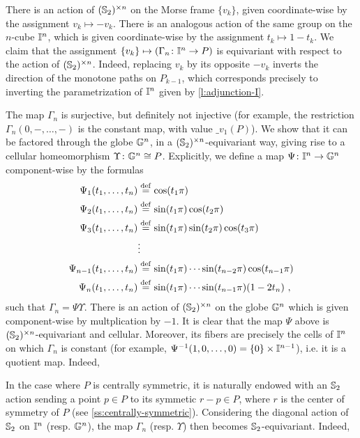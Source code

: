 There is an action of $(\mathbb{S}_2)^{\times n}$ on the Morse frame $\{ v_k \}$, given coordinate-wise by the assignment $v_k \mapsto -v_k$.
There is an analogous action of the same group on the $n$-cube $\mathbb{I}^n$, which is given coordinate-wise by the assignment $t_k \mapsto 1-t_k$.
We claim that the assignment $\{v_k\} \mapsto (\Gamma_n \colon \mathbb{I}^n \to P)$ is equivariant with respect to the action of $(\mathbb{S}_2)^{\times n}$.
Indeed, replacing $v_k$ by its opposite $-v_k$ inverts the direction of the monotone paths on $P_{k-1}$, which corresponds precisely to inverting the parametrization of $\mathbb{I}^n$ given by \cref{l:adjunction-I}.

The map $\Gamma_n$ is surjective, but definitely not injective (for example, the restriction $\Gamma_n(0,-,\ldots,-)$ is the constant map, with value $\bm_{v_1}(P)$).
We show that it can be factored through the globe $\mathbb{G}^n$, in a $(\mathbb{S}_2)^{\times n}$-equivariant way, giving rise to a cellular homeomorphism $\Upsilon \colon \mathbb{G}^n \cong P$.
Explicitly, we define a map $\Psi \colon \mathbb{I}^n \to \mathbb{G}^n$ component-wise by the formulas
\begin{align*}
	\Psi_1(t_1,\ldots,t_n) & \stackrel{\mathrm{def}}{=} \cos(t_1 \pi) \\
	\Psi_2(t_1,\ldots,t_n) & \stackrel{\mathrm{def}}{=} \sin(t_1 \pi)\cos(t_2\pi) \\
	\Psi_3(t_1,\ldots,t_n) & \stackrel{\mathrm{def}}{=} \sin(t_1 \pi)\sin(t_2\pi)\cos(t_3\pi) \\
	 & \vdots \\
	\Psi_{n-1}(t_1,\ldots,t_n) & \stackrel{\mathrm{def}}{=} \sin(t_1 \pi) \cdots \sin(t_{n-2} \pi) \cos(t_{n-1} \pi) \\
	\Psi_n(t_1,\ldots,t_n) & \stackrel{\mathrm{def}}{=}  \sin(t_1 \pi) \cdots \sin(t_{n-1} \pi)  (1-2t_n)\ ,
\end{align*}
such that $\Gamma_n = \Psi \Upsilon$.
There is an action of $(\mathbb{S}_2)^{\times n}$ on the globe $\mathbb{G}^n$ which is given component-wise by multplication by $-1$.
It is clear that the map $\Psi$ above is $(\mathbb{S}_2)^{\times n}$-equivariant and cellular.
Moreover, its fibers are precisely the cells of $\mathbb{I}^n$ on which $\Gamma_n$ is constant (for example, $\Psi^{-1}(1,0,\ldots,0)=\{0\} \times \mathbb{I}^{n-1}$), i.e. it is a quotient map.
Indeed,

In the case where $P$ is centrally symmetric, it is naturally endowed with an $\mathbb{S}_2$ action sending a point $p \in P$ to its symmetic $r-p \in P$, where $r$ is the center of symmetry of $P$ (see \cref{ss:centrally-symmetric}).
Considering the diagonal action of $\mathbb{S}_2$ on $\mathbb{I}^n$ (resp. $\mathbb{G}^n$), the map $\Gamma_n$ (resp. $\Upsilon$) then becomes $\mathbb{S}_2$-equivariant.
Indeed,
